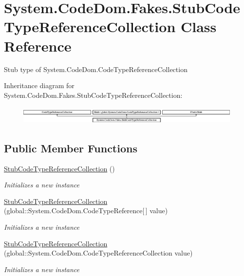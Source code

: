 \hypertarget{class_system_1_1_code_dom_1_1_fakes_1_1_stub_code_type_reference_collection}{\section{System.\-Code\-Dom.\-Fakes.\-Stub\-Code\-Type\-Reference\-Collection Class Reference}
\label{class_system_1_1_code_dom_1_1_fakes_1_1_stub_code_type_reference_collection}
}


Stub type of System.\-Code\-Dom.\-Code\-Type\-Reference\-Collection 


Inheritance diagram for System.\-Code\-Dom.\-Fakes.\-Stub\-Code\-Type\-Reference\-Collection\-:\begin{figure}[H]
\begin{center}
\leavevmode
\includegraphics[height=0.967185cm]{class_system_1_1_code_dom_1_1_fakes_1_1_stub_code_type_reference_collection}
\end{center}
\end{figure}
\subsection*{Public Member Functions}
\begin{DoxyCompactItemize}
\item 
\hyperlink{class_system_1_1_code_dom_1_1_fakes_1_1_stub_code_type_reference_collection_ac911e35a82d4c40715aef119515b9dda}{Stub\-Code\-Type\-Reference\-Collection} ()
\begin{DoxyCompactList}\small\item\em Initializes a new instance\end{DoxyCompactList}\item 
\hyperlink{class_system_1_1_code_dom_1_1_fakes_1_1_stub_code_type_reference_collection_a5a8bf5e8895dbf2937c5ab6d5dec5694}{Stub\-Code\-Type\-Reference\-Collection} (global\-::\-System.\-Code\-Dom.\-Code\-Type\-Reference\mbox{[}$\,$\mbox{]} value)
\begin{DoxyCompactList}\small\item\em Initializes a new instance\end{DoxyCompactList}\item 
\hyperlink{class_system_1_1_code_dom_1_1_fakes_1_1_stub_code_type_reference_collection_a5e5390900c5fe4288839331ca6b943c2}{Stub\-Code\-Type\-Reference\-Collection} (global\-::\-System.\-Code\-Dom.\-Code\-Type\-Reference\-Collection value)
\begin{DoxyCompactList}\small\item\em Initializes a new instance\end{DoxyCompactList}\end{DoxyCompactItemize}
